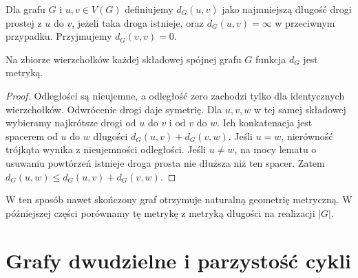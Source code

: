 \begin{center}
\end{center}

\begin{definicja}[Odległość]
Dla grafu $G$ i $u,v\in V(G)$ definiujemy
$d_G(u,v)$ jako najmniejszą długość drogi
prostej z $u$ do $v$, jeżeli taka droga istnieje,
oraz $d_G(u,v)=\infty$ w przeciwnym przypadku.
Przyjmujemy $d_G(v,v)=0$.
\end{definicja}

\begin{stwierdzenie}
Na zbiorze wierzchołków każdej składowej spójnej
grafu $G$ funkcja $d_G$ jest metryką.
\end{stwierdzenie}

\begin{proof}
Odległości są nieujemne, a odległość zero zachodzi
tylko dla identycznych wierzchołków. Odwrócenie
drogi daje symetrię. Dla $u,v,w$ w tej samej
składowej wybieramy najkrótsze drogi od $u$ do $v$
i od $v$ do $w$. Ich konkatenacja jest spacerem od
$u$ do $w$ długości $d_G(u,v)+d_G(v,w)$.
Jeśli $u=w$, nierówność trójkąta wynika z nieujemności
odległości. Jeśli $u\ne w$, na mocy lematu o usuwaniu
powtórzeń istnieje droga prosta nie dłuższa niż ten spacer. Zatem
$d_G(u,w)\le d_G(u,v)+d_G(v,w)$.
\end{proof}

W ten sposób nawet skończony graf otrzymuje naturalną
geometrię metryczną. W późniejszej części porównamy tę
metrykę z metryką długości na realizacji $|G|$.

\section{Grafy dwudzielne i parzystość cykli}
\label{sec:tg-dwudzielne}

